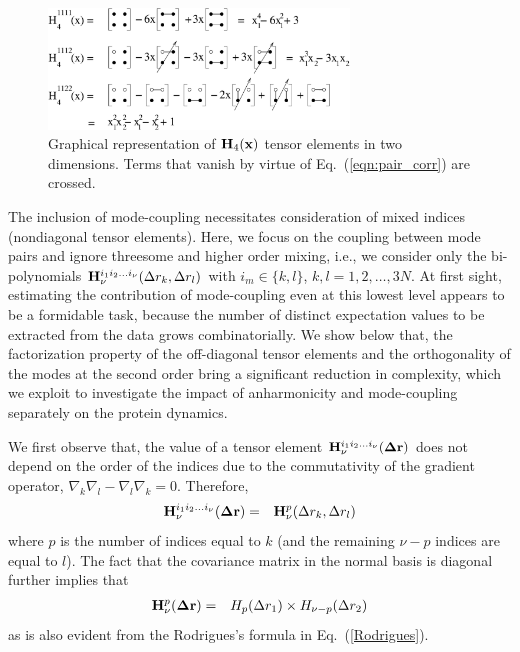 \documentclass[12pt,article]{iopart}
\begin{document}
\begin{figure}[h!]
  \begin{center}
    \includegraphics[width=8cm]{./fig1.eps}
  \end{center}
\caption{Graphical representation of ${\bf H}_4({\bf x})$ tensor elements in two
dimensions. Terms that vanish by virtue of Eq.~(\ref{eqn:pair_corr})
are crossed.}
\label{Fig1}
\end{figure}

The inclusion of mode-coupling necessitates consideration of mixed
indices (nondiagonal tensor elements). Here, we focus on the coupling
between mode pairs and ignore threesome and higher order mixing, i.e.,
we consider only the bi-polynomials ${\bf H}^{i_1i_2\dots
i_\nu}_\nu(\Delta r_k,\Delta r_l)$ with $i_m \in \{k,l\}$,
$k,l=1,2,\dots,3N$. At first sight, estimating the contribution of
mode-coupling even at this lowest level appears to be a formidable
task, because the number of distinct expectation values to be
extracted from the data grows combinatorially. We show below that, the
factorization property of the off-diagonal tensor elements and the
orthogonality of the modes at the second order bring a significant
reduction in complexity, which we exploit to investigate the impact of
anharmonicity and mode-coupling separately on the protein dynamics.

We first observe that, the value of a tensor element ${\bf
H}^{i_1i_2\dots i_\nu}_\nu({\bf \Delta r})$ does not depend on the
order of the indices due to the commutativity of the gradient
operator, $\nabla_k\nabla_l - \nabla_l\nabla_k=0$. Therefore,
\begin{eqnarray}
{\bf H}^{i_1i_2\dots i_\nu}_\nu({\bf \Delta r}) &=& {\bf H}^p_\nu(\Delta r_k,\Delta r_l) \nonumber
\end{eqnarray}
where $p$ is the number of indices equal to $k$ (and the remaining
$\nu-p$ indices are equal to $l$). The fact that the covariance matrix
in the normal basis is diagonal further implies that
\begin{eqnarray}
\label{factorization}
{\bf H}^p_\nu({\bf \Delta r}) &=& H_p(\Delta r_1)\times H_{\nu-p}(\Delta r_2)
\end{eqnarray}
as is also evident from the Rodrigues's formula in Eq.~(\ref{Rodrigues}).
\end{document}
